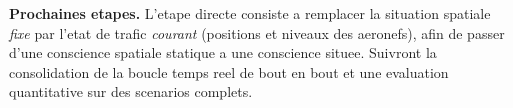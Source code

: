 \documentclass[11pt,a4paper]{article}
\begin{document}
\medskip
\noindent\textbf{Prochaines etapes.} L'etape directe consiste a remplacer la situation
spatiale \emph{fixe} par l'etat de trafic \emph{courant} (positions et niveaux des
aeronefs), afin de passer d'une conscience spatiale statique a une conscience situee.
Suivront la consolidation de la boucle temps reel de bout en bout et une evaluation
quantitative sur des scenarios complets.
\end{document}
